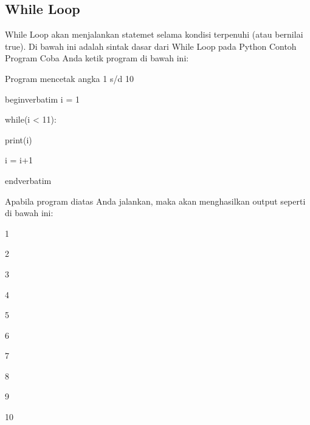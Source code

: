 \subsection{While Loop}
While Loop akan menjalankan statemet selama kondisi terpenuhi (atau bernilai true).\vspace{\baselineskip}
\vspace{\baselineskip}
Di bawah ini adalah sintak dasar dari While Loop pada Python\vspace{\baselineskip}
\vspace{\baselineskip}
Contoh Program\vspace{\baselineskip}
\vspace{\baselineskip}
Coba Anda ketik program di bawah ini:\vspace{\baselineskip}
\vspace{\baselineskip}
 \par
Program mencetak angka 1 s/d 10 \par
\vspace{12pt}
begin{verbatim}
i = 1 \par
while(i < 11): \par
 print(i) \par
 i = i+1 \par
 end{verbatim}
\vspace{\baselineskip}

Apabila program diatas Anda jalankan, maka akan menghasilkan output seperti di bawah ini:\vspace{\baselineskip}
\vspace{\baselineskip}
 \par
1 \par
2 \par
3 \par
4 \par
5 \par
6 \par
7 \par
8 \par
9 \par
10 \par
\vspace{12pt}
\vspace{\baselineskip}
\vspace{12pt}
